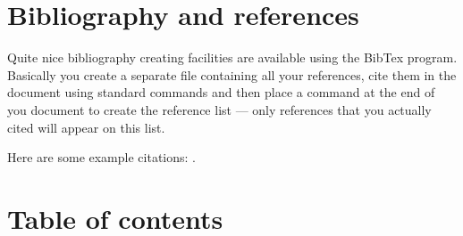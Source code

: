 \documentclass[11pt,a4paper]{article}
\begin{document}
\section{Bibliography and references}

Quite nice bibliography creating facilities are available using the BibTex program. Basically you create a separate file containing all your references, cite them in the document using standard commands and then place a command at the end of you document to create the reference list --- only references that you actually cited will appear on this list.

Here are some example citations: \cite{Billon2004}.

\section{Table of contents}

\tableofcontents
\nocite{*}

 
\end{document}
